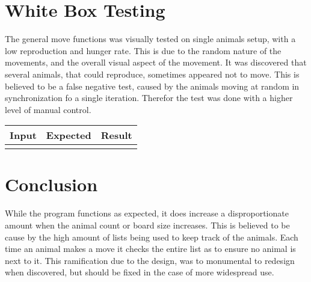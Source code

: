 \documentclass{article}
\begin{document}
    \section{White Box Testing}
    The general move functions was visually tested on single animals setup, with a low reproduction and hunger rate. This is due to the random nature of the movements, and the overall visual aspect of the movement. It was discovered that several animals, that could reproduce, sometimes appeared not to move. This is believed to be a false negative test, caused by the animals moving at random in synchronization fo a single iteration. Therefor the test was done with a higher level of manual control. \newline
   	   \begin{tabular}{|c|c|c|}
   	   		\hline
   	   		Input & Expected & Result\\
   	   		\hline
   	   		&&\\
   	   		\hline
   	   \end{tabular}
    \section{Conclusion}
     While the program functions as expected, it does increase a disproportionate amount when the animal count or board size increases. This is believed to be cause by the high amount of lists being used to keep track of the animals. Each time an animal makes a move it checks the entire list as to ensure no animal is next to it. This ramification due to the design, was to monumental to redesign when discovered, but should be fixed in the case of more widespread use. 
\end{document}

